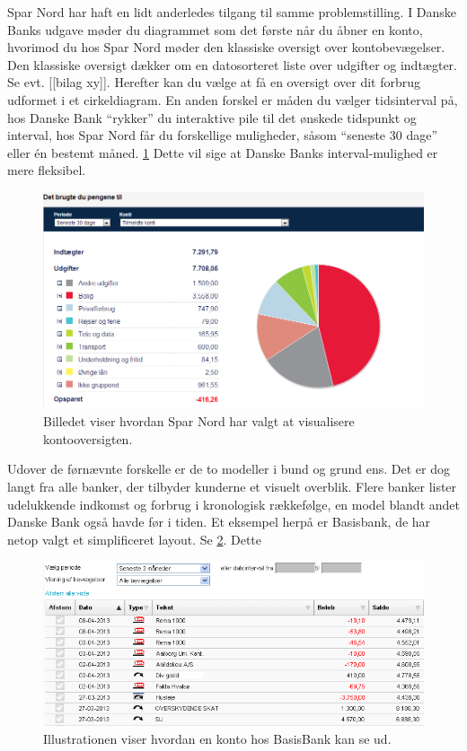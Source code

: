 Spar Nord har haft en lidt anderledes tilgang til samme problemstilling. I Danske Banks udgave møder du diagrammet som det første når du åbner en konto, hvorimod du hos Spar Nord møder den klassiske oversigt over kontobevægelser. Den klassiske oversigt dækker om en datosorteret liste over udgifter og indtægter. Se evt. [[bilag xy]]. Herefter kan du vælge at få en oversigt over dit forbrug udformet i et cirkeldiagram. En anden forskel er måden du vælger tidsinterval på, hos Danske Bank “rykker” du interaktive pile til det ønskede tidspunkt og interval, hos Spar Nord får du forskellige muligheder, såsom “seneste 30 dage” eller én bestemt måned. \ref{SparN} Dette vil sige at Danske Banks interval-mulighed er mere fleksibel.

\begin{figure}[h!]
\centering
\includegraphics[width=1.0\textwidth]{Billeder/SparN.png}
\caption{ Billedet viser hvordan Spar Nord har valgt at visualisere kontooversigten.}
\label{SparN}
\end{figure}

Udover de førnævnte forskelle er de to modeller i bund og grund ens. Det er dog langt fra alle banker, der tilbyder kunderne et visuelt overblik. Flere banker lister udelukkende indkomst og forbrug i kronologisk rækkefølge, en model blandt andet Danske Bank også havde før i tiden. Et eksempel herpå er Basisbank, de har netop valgt et simplificeret layout. Se \ref{BasisB}. Dette 

\begin{figure}[h!]
\centering
\includegraphics[width=1.0\textwidth]{Billeder/Basisbank.png}
\caption{ Illustrationen viser hvordan en konto hos BasisBank kan se ud.}
\label{BasisB}
\end{figure}

